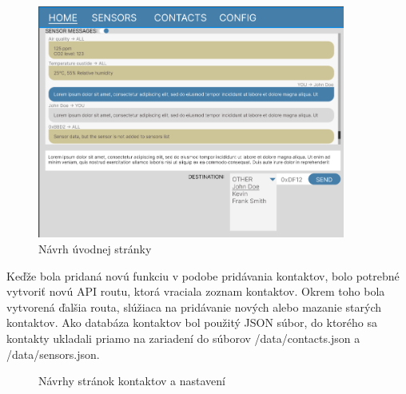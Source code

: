\documentclass[slovak,master]{diploma}
\begin{document}
\begin{figure}[h!]
  \centering
  \includegraphics[width=0.9\textwidth]{Figures/figmaHome.png}
  \caption{Návrh úvodnej stránky}
  \label{fig:figmaHome}
\end{figure}

Keďže bola pridaná novú funkciu v podobe pridávania kontaktov, bolo potrebné vytvoriť novú API routu, ktorá vraciala 
zoznam kontaktov. Okrem toho bola vytvorená ďalšia routa, slúžiaca na pridávanie nových alebo mazanie starých kontaktov. 
Ako databáza kontaktov bol použitý JSON súbor, do ktorého sa kontakty ukladali priamo na zariadení do súborov /data/contacts.json a /data/sensors.json. 

\begin{figure}[h!]
  \centering
  \qquad
  \caption{Návrhy stránok kontaktov a nastavení}
  \label{fig:figma2}
\end{figure}
\end{document}
